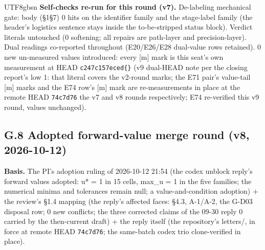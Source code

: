 \documentclass[11pt,letterpaper]{article}
\begin{document}
\begin{CJK}{UTF8}{gbsn}
\textbf{Self-checks re-run for this round (v7).} De-labeling mechanical gate: body (\S{}1\textendash{}\S{}7) 0 hits on the identifier family and the stage-label family (the header's logistics sentence stays inside the to-be-stripped status block). Verdict literals untouched (0 softening; all repairs are path-layer and precision-layer). Dual readings co-reported throughout (E20/E26/E28 dual-value rows retained). 0 new un-measured values introduced: every [m] mark is this seat's own measurement at HEAD \texttt{c247c157eced\textellipsis\{\}} (v9 dual-HEAD note per the closing report's low 1: that literal covers the v2-round marks; the E71 pair's value-tail [m] marks and the E74 row's [m] mark are re-measurements in place at the remote HEAD \texttt{74c7d76} \textemdash{} the v7 and v8 rounds respectively; E74 re-verified this v9 round, values unchanged).

\subsection*{G.8 Adopted forward-value merge round (v8, 2026-10-12)}

\textbf{Basis.} The PI's adoption ruling of 2026-10-12 21:54 (the codex unblock reply's forward values adopted: u* = 1 in 15 cells, max\_u = 1 in the five families; the numerical minima and tolerances remain null; a value-and-condition adoption) + the review's \S{}1.4 mapping (the reply's affected faces: \S{}4.3, A-1/A-2, the G-D03 disposal row; 0 new conflicts; the three corrected claims of the 09-30 reply 0 carried by the then-current draft) + the reply itself (the repository's letters/, in force at remote HEAD \texttt{74c7d76}; the same-batch codex trio clone-verified in place).


\end{CJK}
\end{document}
